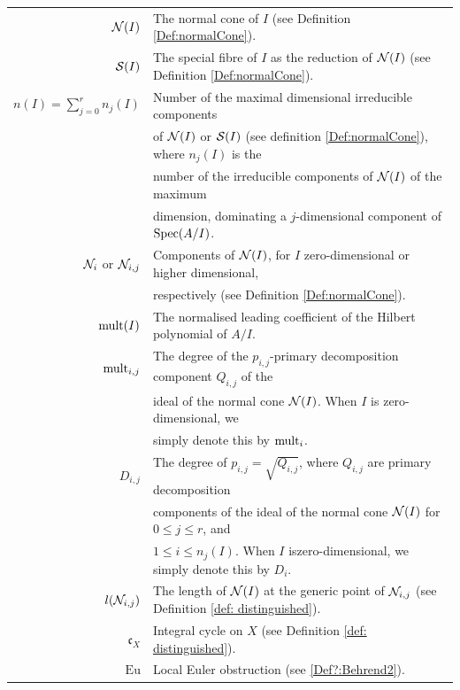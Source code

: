 \documentclass[11pt,a4paper,leqno,noamsfonts]{amsart}
\numberwithin{equation}{section}
\begin{document}
\begin{center}
   \begin{tabular}{ r l }
     ${\mathcal N}(I)$ & The normal cone of $I$ (see Definition \ref{Def:normalCone}).\\
        
      ${\mathcal S}(I)$ & The special fibre of $I$ as the reduction of ${\mathcal N}(I)$
      (see Definition \ref{Def:normalCone}).
      \\


      $n(I)=\sum_{j=0}^{r}n_j(I)$ & Number of the maximal dimensional irreducible components\\& of  ${\mathcal N}(I)$ or ${\mathcal S}(I)$ (see definition \ref{Def:normalCone}), where $n_j(I)$ is the\\& number of the irreducible components of ${\mathcal N}(I)$ of the maximum\\& dimension, dominating a $j$-dimensional component of $\operatorname{Spec}(A/I)$.\\
       ${\mathcal N}_i$ or ${\mathcal N}_{i,j}$ & Components of  ${{\mathcal N}(I)}$, for $I$ zero-dimensional or higher dimensional,\\& respectively (see Definition \ref{Def:normalCone}).\\
         $\mathrm{mult}(I)$ &The normalised leading coefficient of the Hilbert polynomial of $A/I$.\\ 

       $\mathrm{mult}_{i,j}$&  The degree of the $p_{i,j}$-primary decomposition component $Q_{i,j}$ of the\\& ideal of the normal cone ${\mathcal N}(I)$. When $I$ is zero-dimensional, we\\& simply denote this by $\mathrm{mult}_i$.\\  
       
       
       $D_{i,j}$& The degree of $p_{i,j}=\sqrt{Q_{i,j}}$, where $Q_{i,j}$ are primary decomposition\\& components of the ideal of the normal cone ${\mathcal N}(I)$ for $0\leq j \leq r$, and \\& $1\leq i \leq n_j(I)$. When $I$ iszero-dimensional, we simply denote this by $D_i$.\\

             
          $l({\mathcal N}_{i,j})$& The length of ${\mathcal N}(I)$ at the generic point of ${\mathcal N}_{i,j}$ (see Definition \ref{def: distinguished}).\\

  $\mathfrak{c}_{X}$&Integral cycle on $X$ (see Definition \ref{def: distinguished}).\\
$\mathrm{Eu}$&Local Euler obstruction (see \cref{Def?:Behrend2}).\\
       
  \end{tabular}
   \end{center}
\end{document}
